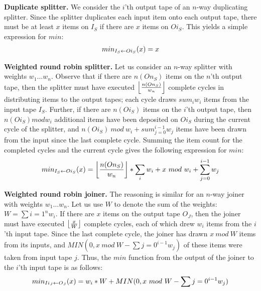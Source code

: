 {\bf Duplicate splitter.}  We consider the $i$'th output tape of an
$n$-way duplicating splitter.  Since the splitter duplicates each
input item onto each output tape, there must be at least $x$ items on
$I_S$ if there are $x$ items on $Oi_S$.  This yields a simple
expression for $min$:
\begin{align*}
min_{I_S \leftarrow Oi_S}(x) = x
\end{align*}

{\bf Weighted round robin splitter.}  Let us consider an $n$-way
splitter with weights $w_1 \dots w_n$.  Observe that if there are
$n(On_S)$ items on the $n$'th output tape, then the splitter must have
executed $\left\lfloor\frac{n(On_S)}{w_n}\right\rfloor$ complete cycles in distributing items
to the output tapes; each cycle draws $sum_{i}{w_i}$ items from the
input tape $I_S$.  Further, if there are $n(Oi_S)$ items on the $i$'th
output tape, then $n(Oi_S) mod w_i$ additional items have been
deposited on $Oi_S$ during the current cycle of the splitter, and
$n(Oi_S)~mod~w_i + sum_{j=0}^{i-1}{w_j}$ items have been drawn from
the input since the last complete cycle.  Summing the item count for
the completed cycles and the current cycle gives the following
expression for $min$:
\begin{align*}
min_{I_S \leftarrow Oi_S}(x) = \left\lfloor\frac{n(On_S)}{w_n}\right\rfloor * \sum_{i}{w_i} + x~mod~w_i +
\sum_{j=0}^{i-1}{w_j}
\end{align*}

{\bf Weighted round robin joiner.}  The reasoning is similar for an
$n$-way joiner with weights $w_1 \dots w_n$.  Let us use $W$ to denote
the sum of the weights: $W = \sum{i=1}^{n}{w_i}$.  If there are $x$
items on the output tape $O_J$, then the joiner must have executed
$\left\lfloor\frac{x}{W}\right\rfloor$ complete cycles, each of which drew $w_i$ items from
the $i$'th input tape.  Since the last complete cycle, the joiner has
drawn $x~mod~W$ items from its inputs, and $MIN(0, x~mod~W -
\sum{j=0}^{i-1}{w_j})$ of these items were taken from input tape $j$.
Thus, the $min$ function from the output of the joiner to the $i$'th
input tape is as follows:
\begin{align*}
min_{Ii_J \leftarrow O_J}(x) = w_i * W + MIN(0, x~mod~W - \sum{j=0}^{i-1}{w_j})
\end{align*}

